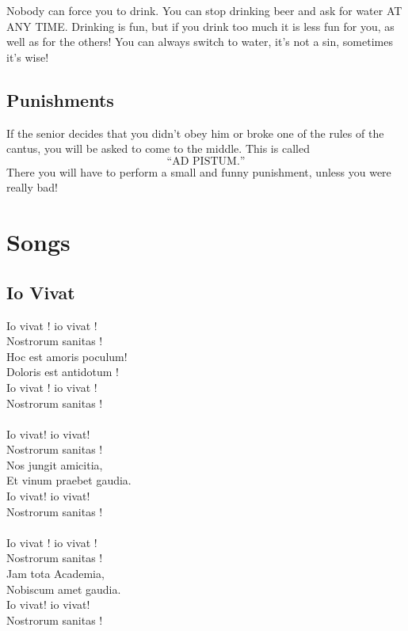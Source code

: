 \documentclass[a5paper]{article}
\begin{document}
Nobody can force you to drink. You can stop drinking beer and ask for water AT ANY TIME. Drinking is fun, but if you drink too much it is less fun for you, as well as for the others! You can always switch to water, it's not a sin, sometimes it's wise!


\subsection{Punishments} %
\label{sub:punishments}

If the senior decides that you didn't obey him or broke one of the rules of the cantus, you will be asked to come to the middle. This is called $$\text{``AD PISTUM.''}$$ There you will have to perform a small and funny punishment, unless you were really bad!

\newpage
\clearpage




\twocolumn
\section{Songs}
\label{sec:songs}

\subsection{Io Vivat} %
\label{sub:io_vivat}
Io vivat ! io vivat ! \\
Nostrorum sanitas !\\
Hoc est amoris poculum!\\
Doloris est antidotum !\\
Io vivat ! io vivat !\\
Nostrorum sanitas !\\
\\
Io vivat! io vivat!\\
Nostrorum sanitas !\\
Nos jungit amicitia,\\
Et vinum praebet gaudia.\\
Io vivat! io vivat!\\
Nostrorum sanitas !\\
\\
Io vivat ! io vivat !\\
Nostrorum sanitas !\\
Jam tota Academia,\\
Nobiscum amet gaudia.\\
Io vivat! io vivat!\\
Nostrorum sanitas !\\
\end{document}

